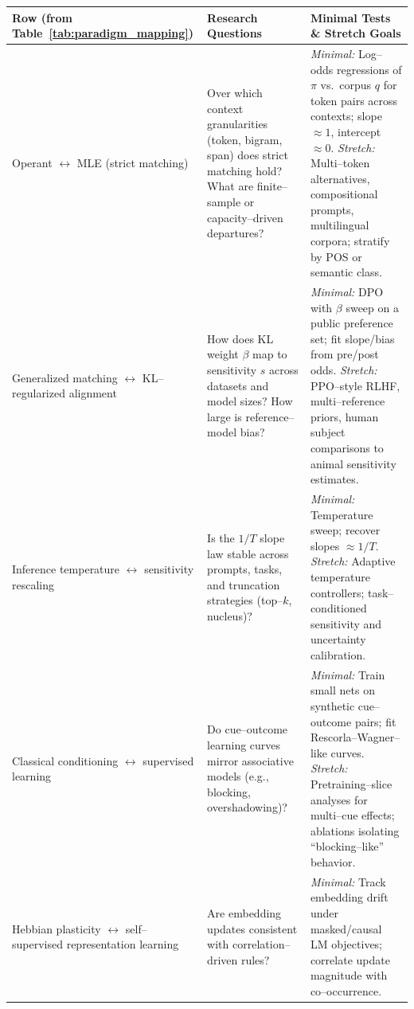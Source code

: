 \documentclass[11pt]{article}
\begin{document}
\begin{table}[h!]
\centering
\begin{tabular}{|p{}|p{}|p{}|}
\hline
\textbf{Row (from Table~\ref{tab:paradigm_mapping})} & \textbf{Research Questions} & \textbf{Minimal Tests \& Stretch Goals} \\
\hline
Operant $\leftrightarrow$ MLE (strict matching) &
Over which context granularities (token, bigram, span) does strict matching hold? What are finite–sample or capacity–driven departures? &
\emph{Minimal:} Log–odds regressions of $\pi$ vs.\ corpus $q$ for token pairs across contexts; slope $\approx 1$, intercept $\approx 0$. \newline
\emph{Stretch:} Multi–token alternatives, compositional prompts, multilingual corpora; stratify by POS or semantic class.\\
\hline
Generalized matching $\leftrightarrow$ KL–regularized alignment &
How does KL weight $\beta$ map to sensitivity $s$ across datasets and model sizes? How large is reference–model bias? &
\emph{Minimal:} DPO with $\beta$ sweep on a public preference set; fit slope/bias from pre/post odds. \newline
\emph{Stretch:} PPO–style RLHF, multi–reference priors, human subject comparisons to animal sensitivity estimates.\\
\hline
Inference temperature $\leftrightarrow$ sensitivity rescaling &
Is the $1/T$ slope law stable across prompts, tasks, and truncation strategies (top–$k$, nucleus)? &
\emph{Minimal:} Temperature sweep; recover slopes $\approx 1/T$. \newline
\emph{Stretch:} Adaptive temperature controllers; task–conditioned sensitivity and uncertainty calibration.\\
\hline
Classical conditioning $\leftrightarrow$ supervised learning &
Do cue–outcome learning curves mirror associative models (e.g., blocking, overshadowing)? &
\emph{Minimal:} Train small nets on synthetic cue–outcome pairs; fit Rescorla–Wagner–like curves. \newline
\emph{Stretch:} Pretraining–slice analyses for multi–cue effects; ablations isolating “blocking–like” behavior.\\
\hline
Hebbian plasticity $\leftrightarrow$ self–supervised representation learning &
Are embedding updates consistent with correlation–driven rules? &
\emph{Minimal:} Track embedding drift under masked/causal LM objectives; correlate update magnitude with co–occurrence. \newline

\end{tabular}
\end{table}
\end{document}
